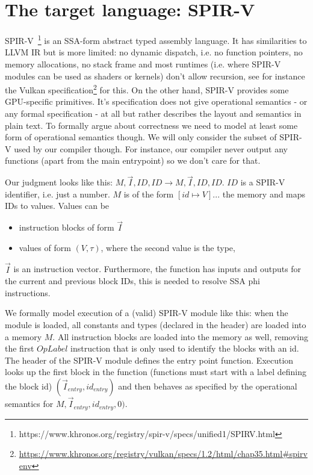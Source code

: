 \documentclass[letterpaper,12pt]{article}
\newcommand{\vi}{\vec{I}}
\begin{document}
\section{The target language: SPIR-V}

SPIR-V~\footnote{https://www.khronos.org/registry/spir-v/specs/unified1/SPIRV.html}
is an SSA-form abstract typed assembly language. It has
similarities to LLVM IR but is more limited: no dynamic dispatch,
i.e. no function pointers, no memory allocations, no stack frame and
most runtimes (i.e. where SPIR-V modules can be used as shaders or
kernels) don't allow recursion, see for instance the Vulkan 
specification\footnote{\url{https://www.khronos.org/registry/vulkan/specs/1.2/html/chap35.html\#spirvenv}}
for this. On the other hand, SPIR-V provides some 
GPU-specific primitives.
It's specification does not give operational semantics - or 
any formal specification - at all but rather describes the layout 
and semantics in plain text. To formally argue about correctness we need 
to model at least some form of operational semantics though. We will
only consider the subset of SPIR-V used by our compiler though.
For instance, our compiler never output any functions (apart from the
main entrypoint) so we don't care for that.

Our judgment looks like this: $M, \vi, ID, ID \rightarrow M, \vi, ID, ID$.
$ID$ is a SPIR-V identifier, i.e. just a number.
$M$ is of the form $[id \mapsto V] ... $ the memory and maps IDs to values. Values can be 
\begin{itemize}
	\item instruction blocks of form $\vi$
	\item values of form $(V, \tau)$, where the second value is the type,
\end{itemize}
$\vi$ is an instruction vector.
Furthermore, the function has inputs and outputs for the current and previous
block IDs, this is needed to resolve SSA phi instructions.

We formally model execution of a (valid) SPIR-V module like this: when the module
is loaded, all constants and types (declared in the header) are loaded
into a memory $M$. All instruction blocks are loaded into the memory as well,
removing the first $OpLabel$ instruction that is only used to identify
the blocks with an id.
The header of the SPIR-V module defines the entry point function.
Execution looks up the first block in the function (functions must start with 
a label defining the block id) $(\vi_{entry}, id_{entry})$ and then behaves as specified
by the operational semantics for $M, \vi_{entry}, id_{entry}, 0)$.
\end{document}
